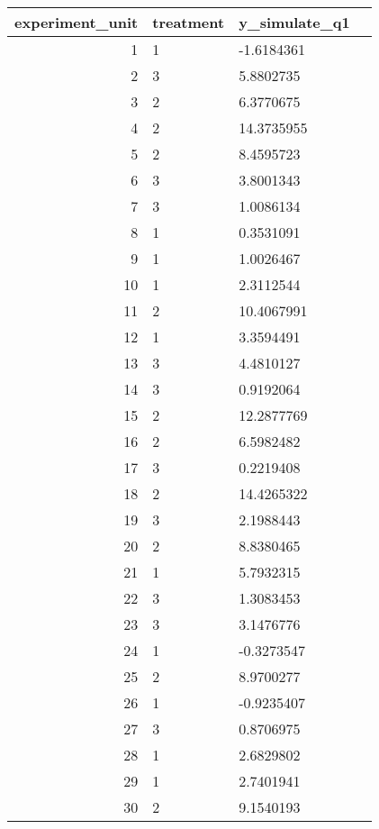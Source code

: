 \documentclass[11pt]{article}
\begin{document}
    \begin{tabular}{r|lll}
 experiment\_unit & treatment & y\_simulate\_q1\\
\hline
	  1         & 1          & -1.6184361\\
	  2         & 3          &  5.8802735\\
	  3         & 2          &  6.3770675\\
	  4         & 2          & 14.3735955\\
	  5         & 2          &  8.4595723\\
	  6         & 3          &  3.8001343\\
	  7         & 3          &  1.0086134\\
	  8         & 1          &  0.3531091\\
	  9         & 1          &  1.0026467\\
	 10         & 1          &  2.3112544\\
	 11         & 2          & 10.4067991\\
	 12         & 1          &  3.3594491\\
	 13         & 3          &  4.4810127\\
	 14         & 3          &  0.9192064\\
	 15         & 2          & 12.2877769\\
	 16         & 2          &  6.5982482\\
	 17         & 3          &  0.2219408\\
	 18         & 2          & 14.4265322\\
	 19         & 3          &  2.1988443\\
	 20         & 2          &  8.8380465\\
	 21         & 1          &  5.7932315\\
	 22         & 3          &  1.3083453\\
	 23         & 3          &  3.1476776\\
	 24         & 1          & -0.3273547\\
	 25         & 2          &  8.9700277\\
	 26         & 1          & -0.9235407\\
	 27         & 3          &  0.8706975\\
	 28         & 1          &  2.6829802\\
	 29         & 1          &  2.7401941\\
	 30         & 2          &  9.1540193\\
\end{tabular}
\end{document}
